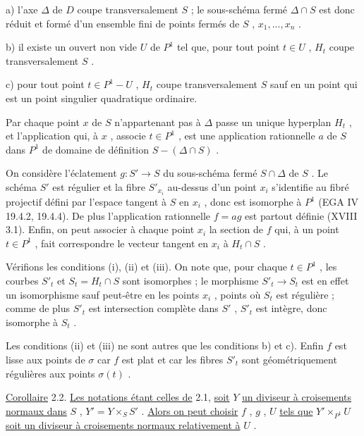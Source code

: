 a) l'axe  $\Delta$  de  $D$  coupe transversalement  $S$ ; le sous-schéma fermé  $\Delta \cap S$  est donc réduit et formé d'un ensemble fini de points fermés de  $S$ , $x_1,...,x_n$ .

b) il existe un ouvert non vide  $U$  de  $P^1$  tel que, pour tout point  $t \in U$ , $H_t$  coupe transversalement  $S$ .

c) pour tout point  $t \in P^1-U$ , $H_t$  coupe transversalement  $S$  sauf en un point qui est un point singulier quadratique ordinaire.

Par chaque point  $x$  de  $S$  n'appartenant pas à  $\Delta$  passe un unique hyperplan  $H_t$ , et l'application qui, à  $x$ , associe  $t \in P^1$ , est une application rationnelle  $a$  de  $S$  dans  $P^1$  de domaine de définition  $S-(\Delta \cap S)$ .

On considère l'éclatement  $g : S' \longrightarrow S$  du sous-schéma fermé  $S \cap \Delta$  de  $S$ . Le schéma  $S'$  est régulier et la fibre  $S'_{x_i}$  au-dessus d'un point  $x_i$  s'identifie au fibré projectif défini par l'espace tangent à  $S$  en  $x_i$ , donc est isomorphe à  $P^1$  (EGA IV 19.4.2, 19.4.4). De plus l'application rationnelle  $f = ag$  est partout définie (XVIII 3.1). Enfin, on peut associer à chaque point  $x_i$  la section de  $f$  qui, à un point  $t \in P^1$ , fait correspondre le vecteur tangent en  $x_i$  à  $H_t \cap S$ .

Vérifions les conditions (i), (ii) et (iii). On note que, pour chaque  $t \in P^1$ , les courbes  $S'_t$  et  $S_t = H_t \cap S$  sont isomorphes ; le morphisme  $S'_t \longrightarrow S_t$  est en effet un isomorphisme sauf peut-être en les points  $x_i$ , points où  $S_t$  est régulière ; comme de plus  $S'_t$  est intersection complète dans  $S'$ , $S'_t$  est intègre, donc isomorphe à  $S_t$ .

Les conditions (ii) et (iii) ne sont autres que les conditions b) et c). Enfin  $f$  est lisse aux points de  $\sigma$  car  $f$  est plat et car les fibres  $S'_t$  sont géométriquement régulières aux points  $\sigma(t)$ .



\underline{Corollaire} 2.2. \underline{Les notations étant celles de} 2.1, \underline{soit} $Y$ \underline{un diviseur à croisements normaux dans} $S$ , $Y' = Y \times_S S'$ . \underline{Alors on peut choisir} $f$ , $g$ , $U$ \underline{tels que} $Y'\times_{P^1}U$ \underline{soit un diviseur à croisements normaux relativement à} $U$ .

